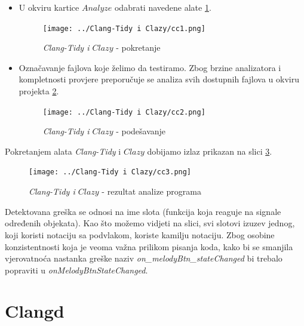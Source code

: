 \documentclass[a4paper]{article}
\begin{document}
\begin{itemize}
	\item U okviru kartice $Analyze$ odabrati navedene alate \ref{fig:cc1}.
	\begin{figure}
		\centering
		\caption{\textit{\textit{Clang-Tidy} i $Clazy$} - pokretanje}
		\label{fig:cc1}
		\texttt{[image: ../Clang-Tidy i Clazy/cc1.png]}
	\end{figure}
	\item Označavanje fajlova koje želimo da testiramo. Zbog brzine analizatora i kompletnosti provjere preporučuje se analiza svih dostupnih fajlova u okviru projekta \ref{fig:cc2}.
	\begin{figure}[h!]
		\centering
		\caption{\textit{\textit{Clang-Tidy} i $Clazy$} - podešavanje}
		\label{fig:cc2}
		\texttt{[image: ../Clang-Tidy i Clazy/cc2.png]}
	\end{figure}
\end{itemize}

Pokretanjem alata \textit{Clang-Tidy} i $Clazy$ dobijamo izlaz prikazan na slici \ref{fig:cc3}.
	\begin{figure}[h!]
		\caption{\textit{\textit{Clang-Tidy} i $Clazy$} - rezultat analize programa}
		\label{fig:cc3}
		\texttt{[image: ../Clang-Tidy i Clazy/cc3.png]}
	\end{figure}
	
	Detektovana greška se odnosi na ime slota (funkcija koja reaguje na signale određenih objekata). Kao što možemo vidjeti na slici, svi slotovi izuzev jednog, koji koristi notaciju sa podvlakom, koriste kamilju notaciju. Zbog osobine konzistentnosti koja je veoma važna prilikom pisanja koda, kako bi se smanjila vjerovatnoća nastanka greške naziv \textit{on\_melodyBtn\_stateChanged} bi trebalo popraviti u \textit{onMelodyBtnStateChanged}.
	
	\section{Clangd}
	
\end{document}
